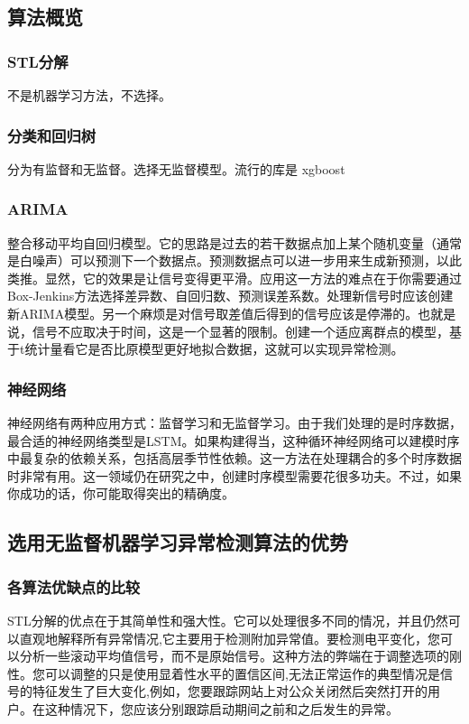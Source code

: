\documentclass[UTF8]{ctexart}
\begin{document}
    \subsection{算法概览}
        \subsubsection{STL分解}
        不是机器学习方法，不选择。
        \subsubsection{分类和回归树}
        分为有监督和无监督。选择无监督模型。流行的库是 xgboost
        \subsubsection{ARIMA}
        整合移动平均自回归模型。它的思路是过去的若干数据点加上某个随机变量（通常是白噪声）可以预测下一个数据点。预测数据点可以进一步用来生成新预测，以此类推。显然，它的效果是让信号变得更平滑。应用这一方法的难点在于你需要通过Box-Jenkins方法选择差异数、自回归数、预测误差系数。处理新信号时应该创建新ARIMA模型。另一个麻烦是对信号取差值后得到的信号应该是停滞的。也就是说，信号不应取决于时间，这是一个显著的限制。创建一个适应离群点的模型，基于t统计量看它是否比原模型更好地拟合数据，这就可以实现异常检测。\cite{link11}
        \subsubsection{神经网络}
        神经网络有两种应用方式：监督学习和无监督学习。由于我们处理的是时序数据，最合适的神经网络类型是LSTM。如果构建得当，这种循环神经网络可以建模时序中最复杂的依赖关系，包括高层季节性依赖。这一方法在处理耦合的多个时序数据时非常有用。这一领域仍在研究之中，创建时序模型需要花很多功夫。不过，如果你成功的话，你可能取得突出的精确度。\cite{link11}

    \subsection{选用无监督机器学习异常检测算法的优势}
        \subsubsection{各算法优缺点的比较}
        STL分解的优点在于其简单性和强大性。它可以处理很多不同的情况，并且仍然可以直观地解释所有异常情况,它主要用于检测附加异常值。要检测电平变化，您可以分析一些滚动平均值信号，而不是原始信号。这种方法的弊端在于调整选项的刚性。您可以调整的只是使用显着性水平的置信区间,无法正常运作的典型情况是信号的特征发生了巨大变化,例如，您要跟踪网站上对公众关闭然后突然打开的用户。在这种情况下，您应该分别跟踪启动期间之前和之后发生的异常。
\end{document}

